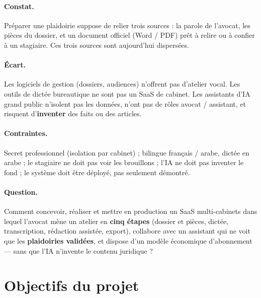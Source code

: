 \paragraph{Constat.}
Préparer une plaidoirie suppose de relier trois sources : la parole de l'avocat, les pièces du dossier, et un document officiel (Word / PDF) prêt à relire ou à confier à un stagiaire. Ces trois sources sont aujourd'hui dispersées.

\paragraph{Écart.}
Les logiciels de gestion (dossiers, audiences) n'offrent pas d'atelier vocal. Les outils de dictée bureautique ne sont pas un SaaS de cabinet. Les assistants d'IA grand public n'isolent pas les données, n'ont pas de rôles avocat / assistant, et risquent d'\textbf{inventer} des faits ou des articles.

\paragraph{Contraintes.}
Secret professionnel (isolation par cabinet) ; bilingue français / arabe, dictée en arabe ; le stagiaire ne doit pas voir les brouillons ; l'IA ne doit pas inventer le fond ; le système doit être déployé, pas seulement démontré.

\paragraph{Question.}
Comment concevoir, réaliser et mettre en production un SaaS multi-cabinets dans lequel l'avocat mène un atelier en \textbf{cinq étapes} (dossier et pièces, dictée, transcription, rédaction assistée, export), collabore avec un assistant qui ne voit que les \textbf{plaidoiries validées}, et dispose d'un modèle économique d'abonnement --- sans que l'IA n'invente le contenu juridique ?

\section{Objectifs du projet}

